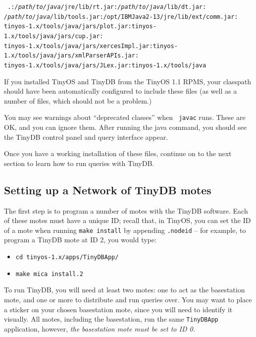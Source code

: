 \documentclass[11pt]{article}
\newcommand{\docroot}{tinyos-1.x}
\newcommand{\java}{tinyos-1.x/tools/java}
\begin{document}
\begin{enumerate}
{\tt
.:{\it /path/to/java}/jre/lib/rt.jar:{\it /path/to/java}/lib/dt.jar:\\
{\it /path/to/java/}lib/tools.jar:/opt/IBMJava2-13/jre/lib/ext/comm.jar:\\
{\java}/jars/plot.jar:{\java}/jars/cup.jar:\\
{\java}/jars/xercesImpl.jar:{\java}/jars/xmlParserAPIs.jar:\\
{\java}/jars/JLex.jar:{\java}
}

If you installed TinyOS and TinyDB
from the TinyOS 1.1 RPMS, your classpath should have been automatically configured to include these
files (as well as a number of files, which should not be a problem.)

\end{enumerate}


\noindent You may see warnings about ``deprecated classes'' when {\tt
javac} runs.  These are OK, and you can ignore them.  After running
the java command, you should see the TinyDB control
panel and query interface appear.

Once you have a working installation of these files, continue on to the next section
to learn how to run queries with TinyDB.

\subsection{Setting up a Network of TinyDB motes}

The first step is to program a number
of motes with the TinyDB software.  Each of these motes must have a unique ID;  recall that,
in TinyOS, you can set the ID of a mote when running {\tt make install} by appending {\tt .nodeid}
-- for example, to program a TinyDB mote at ID 2, you would type:

\begin{itemize}
\item {\tt cd \docroot/apps/TinyDBApp/}
\item {\tt make mica install.2}
\end{itemize}

\noindent To run TinyDB, you will need at least two
motes: one to act as the basestation
mote, and one or more to distribute and run queries
over.  You may want to place a sticker on your chosen basestation
mote, since you will need to identify it visually. All
motes, including the basestation, run
the same {\tt TinyDBApp} application, however, {\it the
basestation mote must be set to ID 0.}
\end{document}
